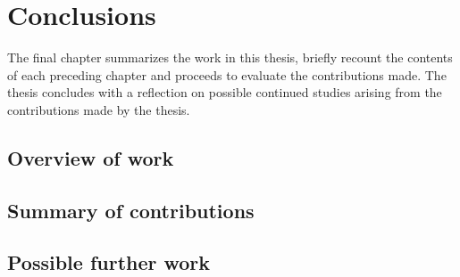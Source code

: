 \chapter{Conclusions}
\vspace{-2em}
\minitoc

The final chapter summarizes the work in this thesis, briefly recount the contents of each preceding chapter and proceeds to evaluate the contributions made.  The thesis concludes with a reflection on possible continued studies arising from the contributions made by the thesis.

\section{Overview of work}

\section{Summary of contributions}

\section{Possible further work}